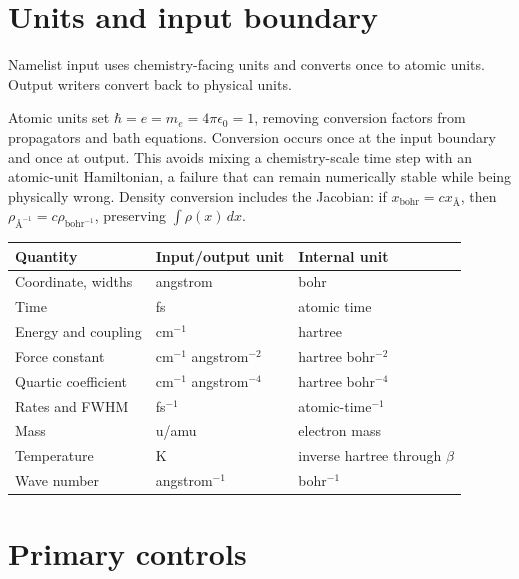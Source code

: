 \documentclass[11pt]{article}
\begin{document}
\section{Units and input boundary}

Namelist input uses chemistry-facing units and converts once to atomic units.
Output writers convert back to physical units.

Atomic units set $\hbar=e=m_e=4\pi\epsilon_0=1$, removing conversion factors from
propagators and bath equations. Conversion occurs once at the input boundary and
once at output. This avoids mixing a chemistry-scale time step with an atomic-unit
Hamiltonian, a failure that can remain numerically stable while being physically
wrong. Density conversion includes the Jacobian: if
$x_{\text{bohr}}=c x_{\text{\AA}}$, then
$\rho_{\text{\AA}^{-1}}=c\rho_{\text{bohr}^{-1}}$, preserving
$\int\rho(x)\,dx$.

\begin{center}
\begin{tabular}{lll}
\toprule
Quantity & Input/output unit & Internal unit\\
\midrule
Coordinate, widths & angstrom & bohr\\
Time & fs & atomic time\\
Energy and coupling & cm$^{-1}$ & hartree\\
Force constant & cm$^{-1}$ angstrom$^{-2}$ & hartree bohr$^{-2}$\\
Quartic coefficient & cm$^{-1}$ angstrom$^{-4}$ & hartree bohr$^{-4}$\\
Rates and FWHM & fs$^{-1}$ & atomic-time$^{-1}$\\
Mass & u/amu & electron mass\\
Temperature & K & inverse hartree through $\beta$\\
Wave number & angstrom$^{-1}$ & bohr$^{-1}$\\
\bottomrule
\end{tabular}
\end{center}

\newpage
\section{Primary controls}
\end{document}
